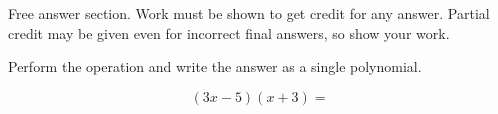 \begin{questions}
\newpage


\hspace{-.5in}Free answer section. Work must be shown to get credit for any answer. Partial credit may be given even for incorrect final answers, so show your work.

\question[5] Perform the operation and write the answer as a single polynomial.
	
 \[(3x-5)(x+3)=\]
\vfill	
%	

	
	

\end{questions}
